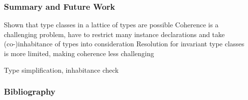 \documentclass{beamer}
\begin{document}
\begin{frame}
  \frametitle{Summary and Future Work}
  Shown that type classes in a lattice of types are possible
  Coherence is a challenging problem, have to restrict many instance declarations and take (co-)inhabitance of types into consideration
  Resolution for invariant type classes is more limited, making coherence less challenging

  Type simplification, inhabitance check

\end{frame}

\begin{frame}
  \frametitle{Bibliography}
  \footnotesize
  
  
\end{frame}
\end{document}
